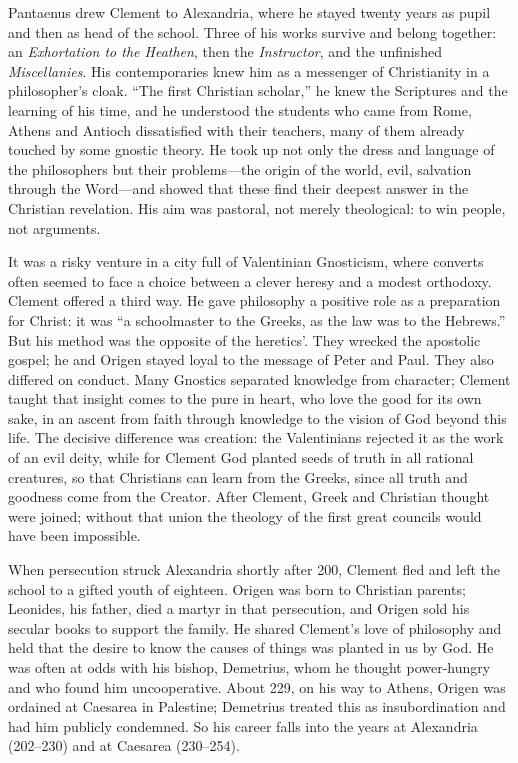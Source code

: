 Pantaenus drew Clement to Alexandria, where he stayed twenty years as pupil and then as head of the
school. Three of his works survive and belong together: an \emph{Exhortation to the Heathen}, then the \emph{Instructor}, and the unfinished \emph{Miscellanies}. His contemporaries knew him as a messenger of
Christianity in a philosopher's cloak. ``The first Christian scholar,'' he knew the Scriptures and the
learning of his time, and he understood the students who came from Rome, Athens and Antioch
dissatisfied with their teachers, many of them already touched by some gnostic theory. He took up not
only the dress and language of the philosophers but their problems---the origin of the world, evil,
salvation through the Word---and showed that these find their deepest answer in the Christian
revelation. His aim was pastoral, not merely theological: to win people, not arguments.

It was a risky venture in a city full of Valentinian Gnosticism, where converts often seemed to face a
choice between a clever heresy and a modest orthodoxy. Clement offered a third way. He gave philosophy
a positive role as a preparation for Christ: it was ``a schoolmaster to the Greeks, as the law was to
the Hebrews.'' But his method was the opposite of the heretics'. They wrecked the apostolic gospel; he
and Origen stayed loyal to the message of Peter and Paul. They also differed on conduct. Many Gnostics
separated knowledge from character; Clement taught that insight comes to the pure in heart, who love
the good for its own sake, in an ascent from faith through knowledge to the vision of God beyond this
life. The decisive difference was creation: the Valentinians rejected it as the work of an evil deity,
while for Clement God planted seeds of truth in all rational creatures, so that Christians can learn
from the Greeks, since all truth and goodness come from the Creator. After Clement, Greek and
Christian thought were joined; without that union the theology of the first great councils would have
been impossible.

When persecution struck Alexandria shortly after 200, Clement fled and left the school to a gifted
youth of eighteen. Origen was born to Christian parents; Leonides, his father, died a martyr in that
persecution, and Origen sold his secular books to support the family. He shared Clement's love of
philosophy and held that the desire to know the causes of things was planted in us by God. He was
often at odds with his bishop, Demetrius, whom he thought power-hungry and who found him
uncooperative. About 229, on his way to Athens, Origen was ordained at Caesarea in Palestine;
Demetrius treated this as insubordination and had him publicly condemned. So his career falls into
the years at Alexandria (202--230) and at Caesarea (230--254).

